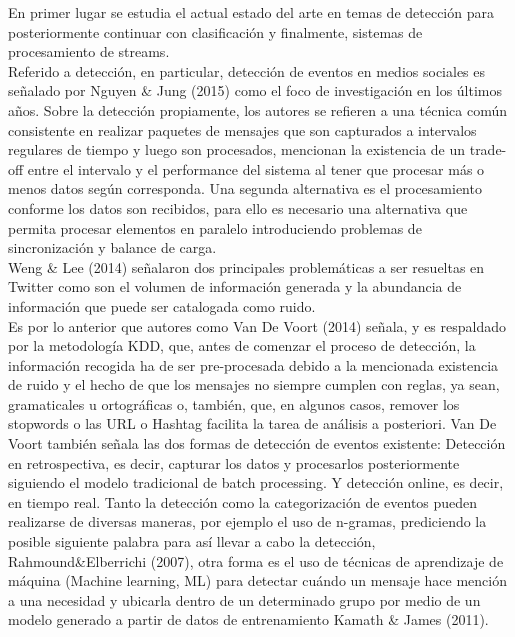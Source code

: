 En primer lugar se estudia el actual estado del arte en temas de detección para posteriormente continuar con clasificación y finalmente, sistemas de procesamiento de streams.\\
Referido a detección, en particular, detección de eventos en medios sociales es señalado por Nguyen \& Jung (2015) como el foco de investigación en los últimos años. Sobre la detección propiamente, los autores se refieren a una técnica común consistente en realizar paquetes de mensajes que son capturados a intervalos regulares de tiempo y luego son procesados, mencionan la existencia de un trade-off entre el intervalo y el performance del sistema al tener que procesar más o menos datos según corresponda. Una segunda alternativa es el procesamiento conforme los datos son recibidos, para ello es necesario una alternativa que permita procesar elementos en paralelo introduciendo problemas de sincronización y balance de carga.\\
Weng \& Lee (2014) señalaron dos principales problemáticas a ser resueltas en Twitter como son el volumen de información generada y la abundancia de información que puede ser catalogada como ruido.\\
Es por lo anterior que autores como Van De Voort (2014) señala, y es respaldado por la metodología KDD, que, antes de comenzar el proceso de detección, la información recogida ha de ser pre-procesada debido a la mencionada existencia de ruido y el hecho de que los mensajes no siempre cumplen con reglas, ya sean, gramaticales u ortográficas o, también, que, en algunos casos, remover los stopwords o las URL o Hashtag facilita la tarea de análisis a posteriori. Van De Voort también señala las dos formas de detección de eventos existente: Detección en retrospectiva, es decir, capturar los datos y procesarlos posteriormente siguiendo el modelo tradicional de batch processing. Y detección online, es decir, en tiempo real. Tanto la detección como la categorización de eventos pueden realizarse de diversas maneras, por ejemplo el uso de n-gramas, prediciendo la posible siguiente palabra para así llevar a cabo la detección, Rahmound\&Elberrichi (2007), otra forma es el uso de técnicas de aprendizaje de máquina (Machine learning, ML) para detectar cuándo un mensaje hace mención a una necesidad y ubicarla dentro de un determinado grupo por medio de un modelo generado a partir de datos de entrenamiento Kamath \& James (2011).\\
